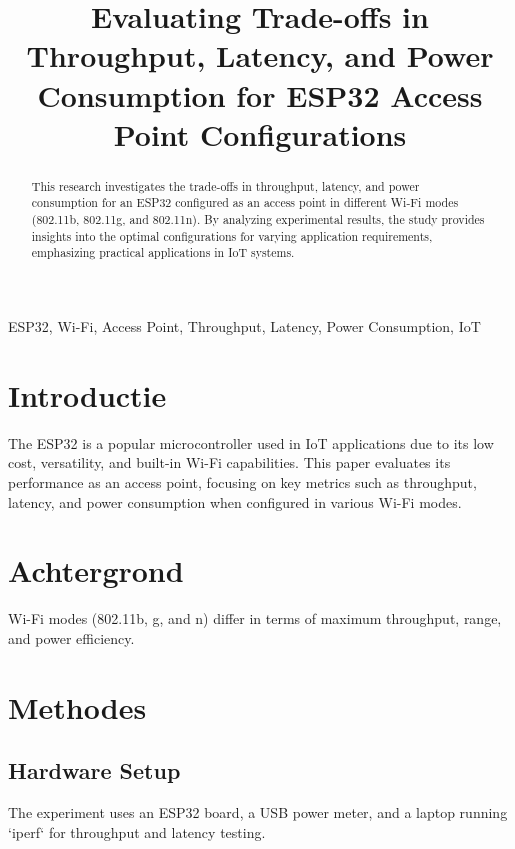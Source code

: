 \documentclass[conference]{IEEEtran}
\begin{document}
\title{Evaluating Trade-offs in Throughput, Latency, and Power Consumption for ESP32 Access Point Configurations}

\author{
}

\maketitle

\begin{abstract}
This research investigates the trade-offs in throughput, latency, and power consumption for an ESP32 configured as an access point in different Wi-Fi modes (802.11b, 802.11g, and 802.11n). By analyzing experimental results, the study provides insights into the optimal configurations for varying application requirements, emphasizing practical applications in IoT systems.
\end{abstract}

\begin{IEEEkeywords}
ESP32, Wi-Fi, Access Point, Throughput, Latency, Power Consumption, IoT
\end{IEEEkeywords}

\section{Introductie}
The ESP32 is a popular microcontroller used in IoT applications due to its low cost, versatility, and built-in Wi-Fi capabilities. This paper evaluates its performance as an access point, focusing on key metrics such as throughput, latency, and power consumption when configured in various Wi-Fi modes. \lipsum[1-2]

\section{Achtergrond}
Wi-Fi modes (802.11b, g, and n) differ in terms of maximum throughput, range, and power efficiency. \lipsum[3-4]

\section{Methodes}
\subsection{Hardware Setup}
The experiment uses an ESP32 board, a USB power meter, and a laptop running `iperf` for throughput and latency testing. \lipsum[5]
\end{document}
